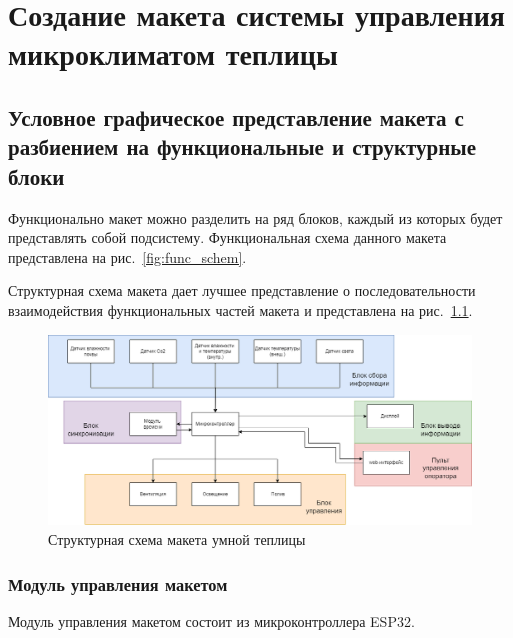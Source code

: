 \chapter{Создание макета системы управления микроклиматом теплицы}

\section{Условное графическое представление макета с разбиением на функциональные и структурные блоки}

Функционально макет можно разделить на ряд блоков, каждый из которых будет представлять собой подсистему. Функциональная схема данного макета представлена на рис.~\ref{fig:func_schem}.

Структурная схема макета дает лучшее представление о последовательности взаимодействия функциональных частей макета и представлена на рис.~\ref{fig:struct_schem}.

\begin{figure}[H]
    \centering
    \includegraphics[scale=0.4]{images/struct_schem.png}
    \caption{Структурная схема макета умной теплицы}
    \label{fig:struct_schem}
\end{figure}

\subsection{Модуль управления макетом}

Модуль управления макетом состоит из микроконтроллера ESP32.%

